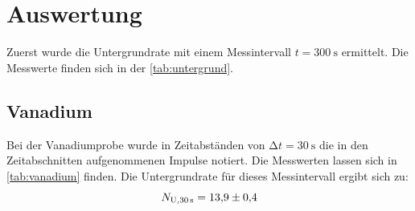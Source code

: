 \section{Auswertung}
\label{sec:Auswertung}
Zuerst wurde die Untergrundrate mit einem Messintervall $t=\SI{300}{\second}$ ermittelt. 
Die Messwerte finden sich in der \autoref{tab:untergrund}.
\subsection{Vanadium}
Bei der Vanadiumprobe wurde in Zeitabständen von $\increment t = \SI{30}{\second}$ die in den Zeitabschnitten aufgenommenen Impulse notiert. 
Die Messwerten lassen sich in \autoref{tab:vanadium} finden. 
Die Untergrundrate für  dieses Messintervall ergibt sich zu:
\begin{equation*}
  N_{\text{U}, \SI{30}{\second}} = \num{13.9 \pm 0.4}
\end{equation*}

